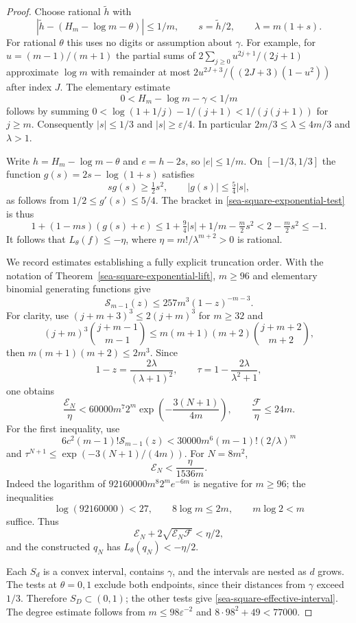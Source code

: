 \documentclass[11pt,a4paper]{article}
\theoremstyle{definition}
\theoremstyle{remark}
\begin{document}
\begin{proof}
Choose rational $\widetilde h$ with
\[
 |\widetilde h-(H_m-\log m-\theta)|\le1/m,
 \qquad s=\widetilde h/2,\qquad\lambda=m(1+s).
\]
For rational $\theta$ this uses no digits or assumption about $\gamma$.
For example, for $u=(m-1)/(m+1)$ the partial sums of
$2\sum_{j\ge0}u^{2j+1}/(2j+1)$ approximate $\log m$ with remainder at most
$2u^{2J+3}/((2J+3)(1-u^2))$ after index $J$.
The elementary estimate
\[
 0<H_m-\log m-\gamma<1/m
\]
follows by summing
$0<\log(1+1/j)-1/(j+1)<1/(j(j+1))$ for $j\ge m$.
Consequently $|s|\le1/3$ and $|s|\ge\varepsilon/4$.
In particular $2m/3\le\lambda\le4m/3$ and $\lambda>1$.

Write $h=H_m-\log m-\theta$ and $e=h-2s$, so $|e|\le1/m$.
On $[-1/3,1/3]$ the function $g(s)=2s-\log(1+s)$ satisfies
\[
 s g(s)\ge\tfrac12s^2,\qquad |g(s)|\le\tfrac54|s|,
\]
as follows from $1/2\le g'(s)\le5/4$.  The bracket in
\eqref{sea-square-exponential-test} is thus
\[
 1+(1-ms)(g(s)+e)
 \le1+\tfrac94|s|+1/m-\tfrac m2s^2
 <2-\tfrac m2s^2\le-1.
\]
It follows that $L_\theta(f)\le-\eta$, where
$\eta=m!/\lambda^{m+2}>0$ is rational.

We record estimates establishing a fully explicit truncation order.
With the notation of Theorem~\ref{sea-square-exponential-lift}, $m\ge96$
and elementary binomial generating functions give
\[
 \mathcal S_{m-1}(z)\le257m^3(1-z)^{-m-3}.
\]
For clarity, use
$(j+m+3)^3\le2(j+m)^3$ for $m\ge32$ and
\[
 (j+m)^3\binom{j+m-1}{m-1}
 \le m(m+1)(m+2)\binom{j+m+2}{m+2},
\]
then $m(m+1)(m+2)\le2m^3$.
Since
\[
 1-z=\frac{2\lambda}{(\lambda+1)^2},\qquad
 \tau=1-\frac{2\lambda}{\lambda^2+1},
\]
one obtains
\[
 \frac{\mathcal E_N}{\eta}
 <60000m^7 2^m\exp\left(-\frac{3(N+1)}{4m}\right),
 \qquad \frac{\mathcal F}{\eta}\le24m.
\]
For the first inequality, use
\[
 6c^2(m-1)!\mathcal S_{m-1}(z)
 <30000m^6(m-1)!(2/\lambda)^m
\]
and $\tau^{N+1}\le\exp(-3(N+1)/(4m))$.
For $N=8m^2$,
\[
 \mathcal E_N<\frac{\eta}{1536m}.
\]
Indeed the logarithm of $92160000m^8 2^m e^{-6m}$ is negative for $m\ge96$;
the inequalities
\[
 \log(92160000)<27,\qquad 8\log m\le2m,\qquad m\log2<m
\]
suffice.
Thus
\[
 \mathcal E_N+2\sqrt{\mathcal E_N\mathcal F}<\eta/2,
\]
and the constructed $q_N$ has $L_\theta(q_N)<-\eta/2$.

Each $S_d$ is a convex interval, contains $\gamma$, and the intervals are
nested as $d$ grows.  The tests at $\theta=0,1$ exclude both endpoints,
since their distances from $\gamma$ exceed $1/3$.  Therefore $S_D\subset(0,1)$;
the other tests give \eqref{sea-square-effective-interval}.
The degree estimate follows from $m\le98\varepsilon^{-2}$ and
$8\cdot98^2+49<77000$.


\end{proof}
\end{document}
